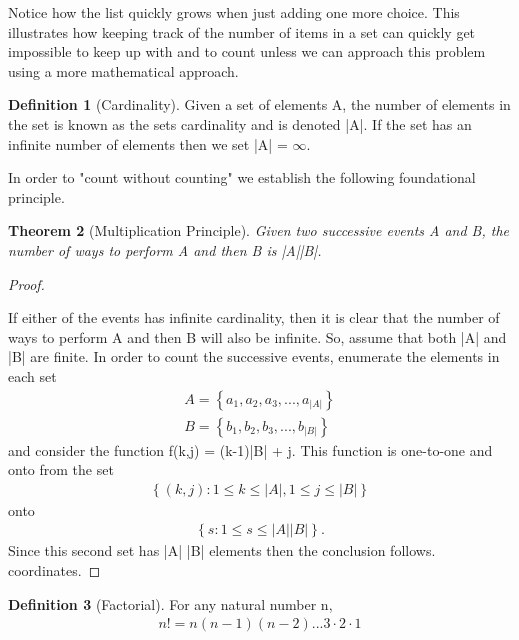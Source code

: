 \documentclass[10pt,]{book}
\theoremstyle{plain}
\newtheorem{theorem}{Theorem}[section]
\theoremstyle{definition}
\newtheorem{definition}[theorem]{Definition}
\theoremstyle{definition}
\theoremstyle{definition}
\numberwithin{equation}{section}
\begin{document}
Notice how the list quickly grows when just adding one more choice. This illustrates how keeping track of the number of items in a set can quickly get impossible to keep up with and to count unless we can approach this problem using a more mathematical approach.
%
\begin{definition}[Cardinality]\label{definition-17}
Given a set of elements A, the number of elements in the 
		set is known as the sets cardinality and is denoted |A|. If the set has 
		an infinite number of elements then we set |A| = \(\infty\).
		\end{definition}
\par
In order to "count without counting" we establish the following 
	foundational principle.%
\begin{theorem}[Multiplication Principle]\label{theorem-9}
Given two successive events A and B, the number of ways 
		to perform A and then B is |A||B|.
		\end{theorem}
\begin{proof}\hypertarget{proof-6}{}
If either of the events has infinite cardinality, then it is 
			clear
			that the number of ways to perform A and then B will also be 
			infinite. So, assume that both |A| and |B| are finite.
			In order to count the successive events, enumerate the elements in
			each set
			\begin{gather*}
A = \left \{ a_1, a_2, a_3, ... , a_{|A|} \right \}\\
B = \left \{  b_1, b_2, b_3, ... , b_{|B|} \right \}
\end{gather*}
			and consider the function f(k,j) = (k-1)|B| + j. This function is 
			one-to-one and onto from the set 
			\begin{gather*}
\left \{ (k,j): 1 \le k \le |A|, 1 \le j \le |B| \right \} 
\end{gather*} 
			onto 
			\begin{gather*}
\left \{ s : 1 \le s \le |A| |B| \right \}.
\end{gather*} 
			Since this
			second set has |A| |B| elements then the conclusion follows. 
			coordinates.%
\end{proof}
\begin{definition}[Factorial]\label{definition-18}
For any natural number n, 
		\begin{gather*}
n! = n(n-1)(n-2) ... 3 \cdot 2 \cdot 1
\end{gather*}
\end{definition}
\end{document}
